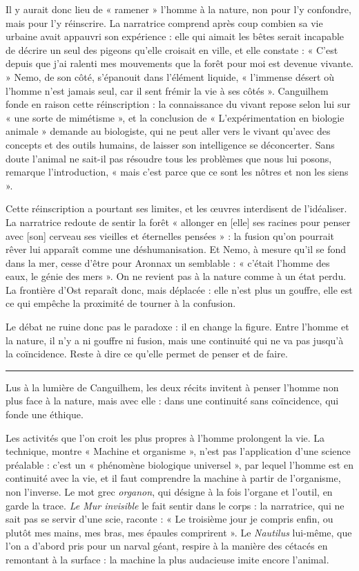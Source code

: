 \documentclass[11pt,a4paper]{article}
\begin{document}
Il y aurait donc lieu de « ramener » l'homme à la nature, non pour l'y confondre, mais pour l'y réinscrire. La narratrice comprend après coup combien sa vie urbaine avait appauvri son expérience : elle qui aimait les bêtes serait incapable de décrire un seul des pigeons qu'elle croisait en ville, et elle constate : « C'est depuis que j'ai ralenti mes mouvements que la forêt pour moi est devenue vivante. » Nemo, de son côté, s'épanouit dans l'élément liquide, « l'immense désert où l'homme n'est jamais seul, car il sent frémir la vie à ses côtés ». Canguilhem fonde en raison cette réinscription : la connaissance du vivant repose selon lui sur « une sorte de mimétisme », et la conclusion de « L'expérimentation en biologie animale » demande au biologiste, qui ne peut aller vers le vivant qu'avec des concepts et des outils humains, de laisser son intelligence se déconcerter. Sans doute l'animal ne sait-il pas résoudre tous les problèmes que nous lui posons, remarque l'introduction, « mais c'est parce que ce sont les nôtres et non les siens ».

Cette réinscription a pourtant ses limites, et les œuvres interdisent de l'idéaliser. La narratrice redoute de sentir la forêt « allonger en {[}elle{]} ses racines pour penser avec {[}son{]} cerveau ses vieilles et éternelles pensées » : la fusion qu'on pourrait rêver lui apparaît comme une déshumanisation. Et Nemo, à mesure qu'il se fond dans la mer, cesse d'être pour Aronnax un semblable : « c'était l'homme des eaux, le génie des mers ». On ne revient pas à la nature comme à un état perdu. La frontière d'Ost reparaît donc, mais déplacée : elle n'est plus un gouffre, elle est ce qui empêche la proximité de tourner à la confusion.

Le débat ne ruine donc pas le paradoxe : il en change la figure. Entre l'homme et la nature, il n'y a ni gouffre ni fusion, mais une continuité qui ne va pas jusqu'à la coïncidence. Reste à dire ce qu'elle permet de penser et de faire.

\begin{center}\rule{0.5\linewidth}{0.5pt}\end{center}

Lus à la lumière de Canguilhem, les deux récits invitent à penser l'homme non plus face à la nature, mais avec elle : dans une continuité sans coïncidence, qui fonde une éthique.

Les activités que l'on croit les plus propres à l'homme prolongent la vie. La technique, montre « Machine et organisme », n'est pas l'application d'une science préalable : c'est un « phénomène biologique universel », par lequel l'homme est en continuité avec la vie, et il faut comprendre la machine à partir de l'organisme, non l'inverse. Le mot grec \emph{organon}, qui désigne à la fois l'organe et l'outil, en garde la trace. \emph{Le Mur invisible} le fait sentir dans le corps : la narratrice, qui ne sait pas se servir d'une scie, raconte : « Le troisième jour je compris enfin, ou plutôt mes mains, mes bras, mes épaules comprirent ». Le \emph{Nautilus} lui-même, que l'on a d'abord pris pour un narval géant, respire à la manière des cétacés en remontant à la surface : la machine la plus audacieuse imite encore l'animal.
\end{document}
